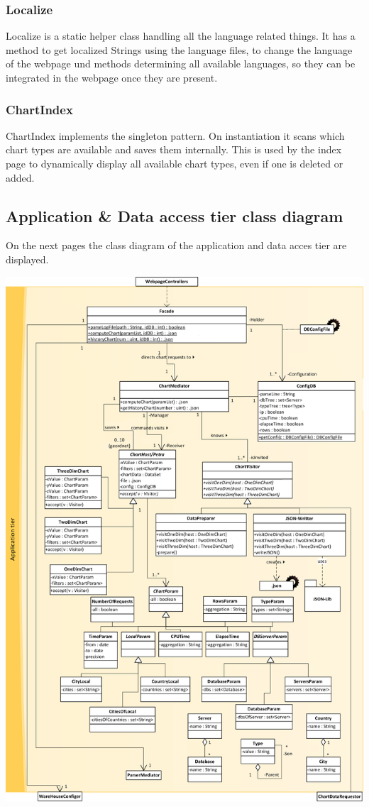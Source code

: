 \subsubsection*{Localize}
Localize is a static helper class handling all the language related things. 
It has a method to get localized Strings using the language files, 
to change the language of the webpage und methods determining all available languages, 
so they can be integrated in the webpage once they are present.

\subsubsection*{ChartIndex}
ChartIndex implements the singleton pattern. On instantiation it scans which chart types are available 
and saves them internally. This is used by the index page to dynamically display all available chart types,
even if one is deleted or added.

\subsection{Application \& Data access tier class diagram}
On the next pages the class diagram of the application and data acces tier are displayed. 
\newpage
\begin{center}
\includegraphics[width=0.9\linewidth]{Pictures/AppTierDia1.png}
\end{center}  

